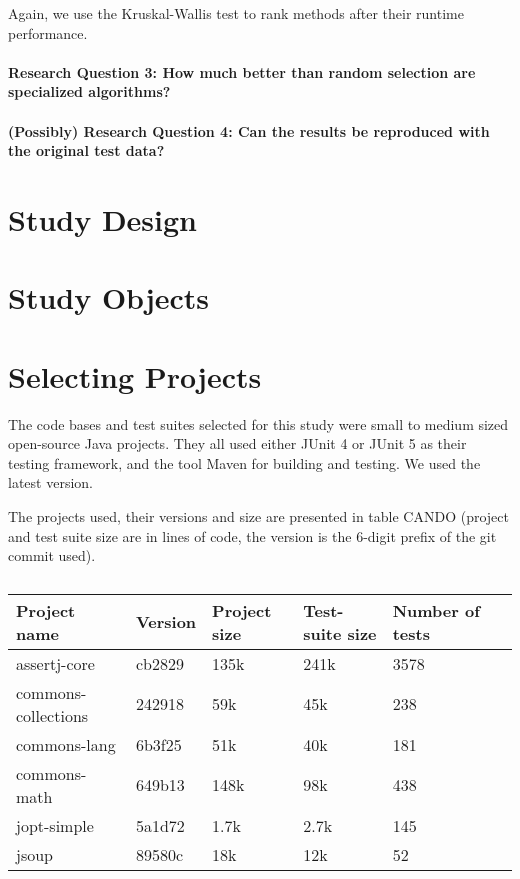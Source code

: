 Again, we use the Kruskal-Wallis test to rank methods after their
runtime performance.

\paragraph{Research Question 3: How much better than random selection are specialized algorithms?}

\paragraph{(Possibly) Research Question 4: Can the results be reproduced with the original test data?}

\section{Study Design}

\section{Study Objects}

\section{Selecting Projects}

The code bases and test suites selected for this study were small to
medium sized open-source Java projects. They all used either JUnit
4 or JUnit 5 as their testing framework, and the tool Maven %
for building and testing. We used the latest version.

The projects used, their versions and size are presented in table CANDO
(project and test suite size are in lines of code, the version is the
6-digit prefix of the git commit used).

\begin{table}[htpb]
	\caption[]{}\label{tab:projects} %
	\centering
	\begin{tabular}{l l l l l l}
		\toprule
		Project name & Version & Project size & Test-suite size & Number of tests \\
		\midrule
		assertj-core & cb2829 & 135k & 241k &3578 \\
		commons-collections & 242918 & 59k & 45k & 238 \\
		commons-lang & 6b3f25 & 51k & 40k & 181 \\
		commons-math & 649b13 & 148k & 98k & 438 \\
		jopt-simple & 5a1d72 & 1.7k & 2.7k & 145 \\
		jsoup & 89580c & 18k & 12k & 52\\
		\bottomrule
	\end{tabular}
\end{table}

